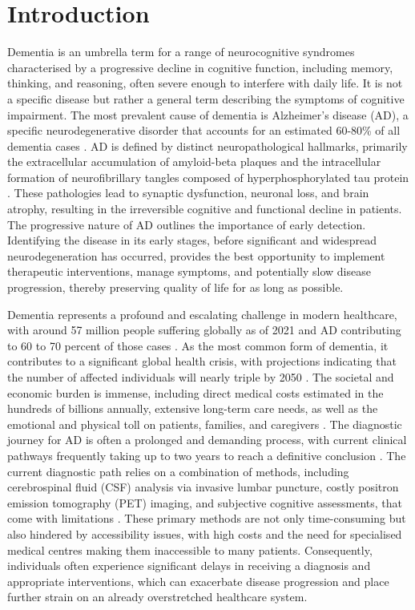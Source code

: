 \documentclass[a4paper,12pt]{article}
\begin{document}
\section{Introduction}
Dementia is an umbrella term for a range of neurocognitive syndromes characterised by a progressive decline in cognitive function, including memory, thinking, and reasoning, often severe enough to interfere with daily life. It is not a specific disease but rather a general term describing the symptoms of cognitive impairment. The most prevalent cause of dementia is Alzheimer's disease (AD), a specific neurodegenerative disorder that accounts for an estimated 60-80\% of all dementia cases \cite{better2023alzheimer}. AD is defined by distinct neuropathological hallmarks, primarily the extracellular accumulation of amyloid-beta plaques and the intracellular formation of neurofibrillary tangles composed of hyperphosphorylated tau protein \cite{deture2019neuropathological}. These pathologies lead to synaptic dysfunction, neuronal loss, and brain atrophy, resulting in the irreversible cognitive and functional decline in patients. The progressive nature of AD outlines the importance of early detection. Identifying the disease in its early stages, before significant and widespread neurodegeneration has occurred, provides the best opportunity to implement therapeutic interventions, manage symptoms, and potentially slow disease progression, thereby preserving quality of life for as long as possible.

Dementia represents a profound and escalating challenge in modern healthcare, with around 57 million people suffering globally as of 2021 and AD contributing to 60 to 70 percent of those cases \cite{WHO2025dementia}. As the most common form of dementia, it contributes to a significant global health crisis, with projections indicating that the number of affected individuals will nearly triple by 2050 \cite{nichols2022estimation}. The societal and economic burden is immense, including direct medical costs estimated in the hundreds of billions annually, extensive long-term care needs, as well as the emotional and physical toll on patients, families, and caregivers \cite{wimo2023worldwide}. The diagnostic journey for AD is often a prolonged and demanding process, with current clinical pathways frequently taking up to two years to reach a definitive conclusion \cite{bungon2021graphene}. The current diagnostic path relies on a combination of methods, including cerebrospinal fluid (CSF) analysis via invasive lumbar puncture, costly positron emission tomography (PET) imaging, and subjective cognitive assessments, that come with limitations \cite{olsson2016csf}. These primary methods are not only time-consuming but also hindered by accessibility issues, with high costs and the need for specialised medical centres making them inaccessible to many patients. Consequently, individuals often experience significant delays in receiving a diagnosis and appropriate interventions, which can exacerbate disease progression and place further strain on an already overstretched healthcare system.
\end{document}
